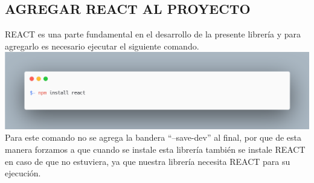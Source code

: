 \subsection{AGREGAR REACT AL PROYECTO}
REACT es una parte fundamental en el desarrollo de la presente librería y para agregarlo es necesario ejecutar el siguiente comando.
\newline
\newline
\includegraphics[width=1\textwidth]{./Imagenes/image23.png}
\newline
\newline
Para este comando no se agrega la bandera “–save-dev” al final, por que de esta manera forzamos a que cuando se instale esta librería también se instale REACT en caso de que no estuviera, ya que nuestra librería necesita REACT para su ejecución.


